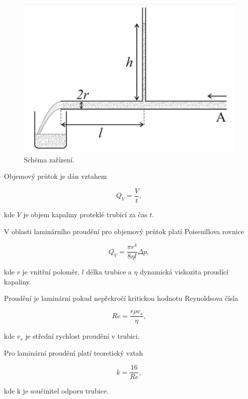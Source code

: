     \begin{figure}[h]
        \centering
        \includegraphics[width=0.5\linewidth]{01 - Studium proudění viskózní kapaliny trubicemi kruhového průřezu//Protokol//img/Schéma.png}
        \caption{Schéma zařízení.}
        \label{fig:schema}
    \end{figure}

    Objemový průtok je dán vztahem

    \begin{equation}
        Q_V = \frac{V}{t},
    \end{equation}

    kde \(V\) je objem kapaliny proteklé trubicí za čas \(t\).

    V oblasti laminárního proudění pro objemový průtok platí Poiseuillova rovnice

    \begin{equation}
        Q_V = \frac{\pi r^4}{8\eta l}\Delta p,
    \end{equation}

    kde \(r\) je vnitřní poloměr, \(l\) délka trubice a \(\eta\) dynamická viskozita proudící kapaliny.

    Proudění je laminární pokud nepřekročí kritickou hodnotu Reynoldsova čísla

    \begin{equation}
        Re = \frac{r\rho v_s}{\eta},
    \end{equation}

    kde \(v_s\) je střední rychlost proudění v trubici.

    Pro laminární proudění platí teoretický vztah

    \begin{equation}
        k = \frac{16}{Re},
    \end{equation}

    kde k je součinitel odporu trubice.
